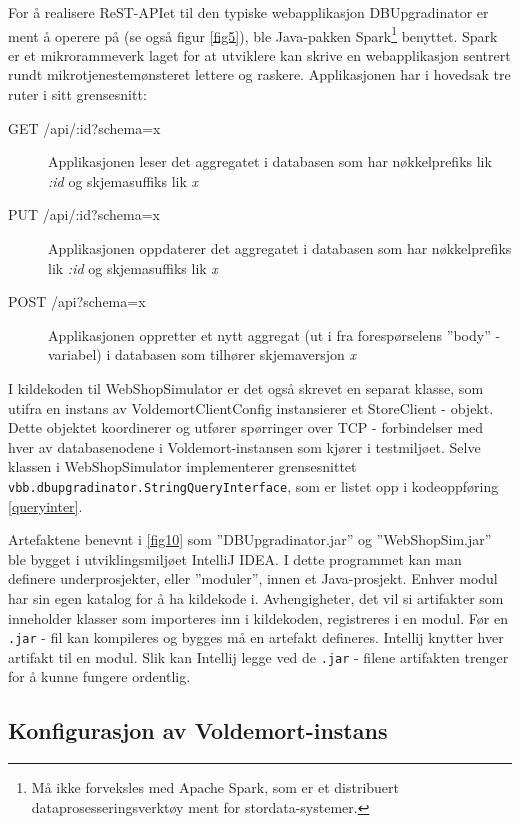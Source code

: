 For å realisere ReST-APIet til den typiske webapplikasjon DBUpgradinator er ment å operere på (se også figur \ref{fig5}), ble Java-pakken Spark\footnote{Må ikke forveksles med Apache Spark, som er et distribuert dataprosesseringsverktøy ment for stordata-systemer.} benyttet. Spark er et mikro\-rammeverk laget for at utviklere kan skrive en webapplikasjon sentrert rundt mikrotjeneste\-mønsteret lettere og raskere. Applikasjonen har i hovedsak tre ruter i sitt grensesnitt:

\begin{description}
  \item[GET /api/:id?schema=x] Applikasjonen leser det aggregatet i databasen som har nøkkelprefiks lik \emph{:id} og skjemasuffiks lik \emph{x}
  \item[PUT /api/:id?schema=x] Applikasjonen oppdaterer det aggregatet i databasen som har nøkkelprefiks lik \emph{:id} og skjemasuffiks lik \emph{x}
  \item[POST /api?schema=x] Applikasjonen oppretter et nytt aggregat (ut i fra forespørselens ''body'' - variabel) i databasen som tilhører skjemaversjon \emph{x}
\end{description}

I kildekoden til WebShopSimulator er det også skrevet en separat klasse, som utifra en instans av VoldemortClientConfig instansierer et StoreClient - objekt. Dette objektet koordinerer og utfører spørringer over TCP - forbindelser med hver av databasenodene i Voldemort-instansen som kjører i testmiljøet. Selve klassen i WebShopSimulator implementerer grensesnittet \texttt{vbb.dbupgradinator.StringQueryInterface}, som er listet opp i kodeoppføring \ref{queryinter}.

Artefaktene benevnt i \ref{fig10} som ''DBUpgradinator.jar'' og ''WebShopSim.jar'' ble bygget i utviklingsmiljøet IntelliJ IDEA. I dette programmet kan man definere underprosjekter, eller ''moduler'', innen et Java-prosjekt. Enhver modul har sin egen katalog for å ha kildekode i. Avhengigheter, det vil si artifakter som inneholder klasser som importeres inn i kildekoden, registreres i en modul. Før en \texttt{.jar} - fil kan kompileres og bygges må en artefakt defineres. Intellij knytter hver artifakt til en modul. Slik kan Intellij legge ved de \texttt{.jar} - filene artifakten trenger for å kunne fungere ordentlig.

\subsection{Konfigurasjon av Voldemort-instans}

